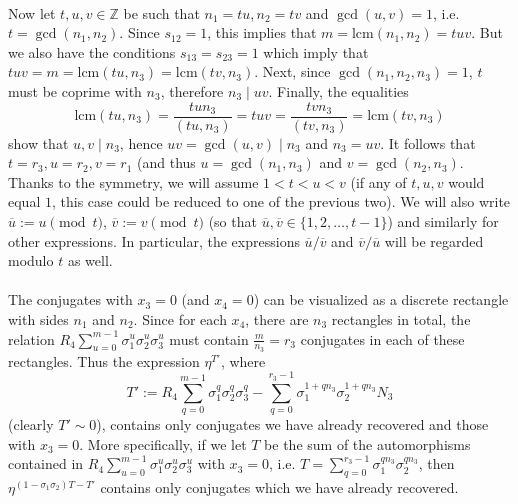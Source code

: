 \documentclass[12pt,a4paper]{article}
\newcommand{\Z}{\mathbb{Z}}
\newcommand{\uo}{\overline{u}}
\newcommand{\vo}{\overline{v}}
\newcommand{\lcm}{\mathrm{lcm}}
\begin{document}
\paragraph*{}
Now let $t,u,v\in\Z$ be such that $n_1=tu,n_2=tv$ and $\gcd(u,v)=1$, i.e. $t=\gcd(n_1,n_2)$. Since $s_{12}=1$, this implies that $m=\lcm(n_1,n_2)=tuv$. But we also have the conditions $s_{13}=s_{23}=1$ which imply that $tuv=m=\lcm(tu,n_3)=\lcm(tv,n_3)$. Next, since $\gcd(n_1,n_2,n_3)=1$, $t$ must be coprime with $n_3$, therefore $n_3\mid uv$. Finally, the equalities $$\lcm(tu,n_3)=\frac{tun_3}{(tu,n_3)}=tuv=\frac{tvn_3}{(tv,n_3)}=\lcm(tv,n_3)$$
show that $u,v\mid n_3$, hence $uv=\gcd(u,v)\mid n_3$ and $n_3=uv$. It follows that $t=r_3,u=r_2,v=r_1$ (and thus $u=\gcd(n_1,n_3)$ and $v=\gcd(n_2,n_3)$. Thanks to the symmetry, we will assume $1<t<u<v$ (if any of $t,u,v$ would equal $1$, this case could be reduced to one of the previous two). We will also write $\uo:=u\pmod{t}$, $\vo:=v\pmod{t}$ (so that $\uo,\vo\in\{1,2,\dots,t-1\}$) and similarly for other expressions. In particular, the expressions $\uo/\vo$ and $\vo/\uo$ will be regarded modulo $t$ as well.
\paragraph*{}
The conjugates with $x_3=0$ (and $x_4=0$) can be visualized as a discrete rectangle with sides $n_1$ and $n_2$. Since for each $x_4$, there are $n_3$ rectangles in total, the relation $R_4\sum_{u=0}^{m-1}\sigma_1^{u}\sigma_2^{u}\sigma_3^{u}$ must contain $\frac{m}{n_3}=r_3$ conjugates in each of these rectangles. Thus the expression $\eta^{T'}$, where  $$T':=R_4\sum_{q=0}^{m-1}\sigma_1^{q}\sigma_2^{q}\sigma_3^{q}-\sum_{q=0}^{r_3-1} \sigma_1^{1+q n_3}\sigma_2^{1+q n_3}N_3 $$
(clearly $T'\sim 0$), contains only conjugates we have already recovered and those with $x_3=0$. More specifically, if we let $T$ be the sum of the automorphisms contained in  $R_4\sum_{u=0}^{m-1}\sigma_1^{u}\sigma_2^{u}\sigma_3^{u}$ with $x_3=0$, i.e. $T=\sum_{q=0}^{r_3-1}\sigma_1^{qn_3}\sigma_2^{qn_3}$, then $\eta^{(1-\sigma_1\sigma_2)T-T'}$ contains only conjugates which we have already recovered.
\end{document}
